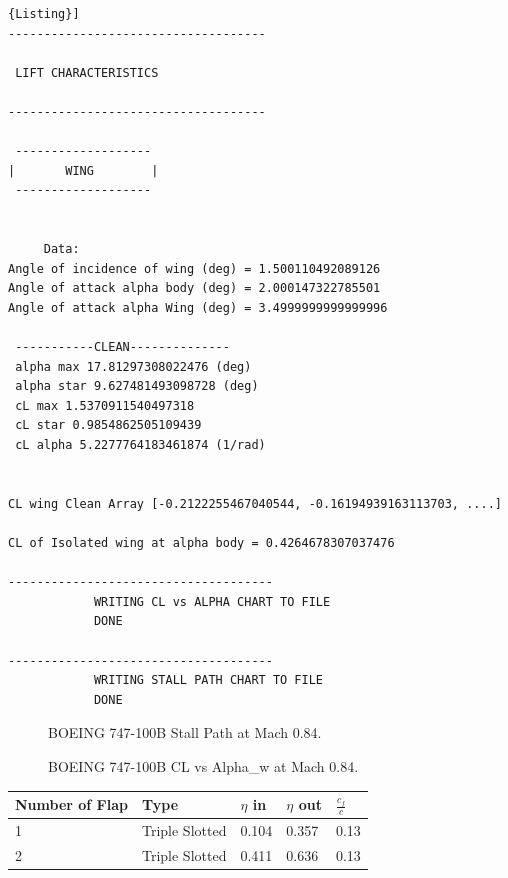 \begin{lstlisting}[caption={{\footnotesize Lift Characteristics of a Lifting Surface - Results. BOEING 747-100B}},label= [style=\bfseries]{Listing}]
------------------------------------

 LIFT CHARACTERISTICS  

------------------------------------

 ------------------- 
|       WING        |
 ------------------- 


	 Data: 
Angle of incidence of wing (deg) = 1.500110492089126
Angle of attack alpha body (deg) = 2.000147322785501
Angle of attack alpha Wing (deg) = 3.4999999999999996

 -----------CLEAN-------------- 
 alpha max 17.81297308022476 (deg)
 alpha star 9.627481493098728 (deg)
 cL max 1.5370911540497318
 cL star 0.9854862505109439
 cL alpha 5.2277764183461874 (1/rad)


CL wing Clean Array [-0.2122255467040544, -0.16194939163113703, ....]

CL of Isolated wing at alpha body = 0.4264678307037476

-------------------------------------
	 	 	WRITING CL vs ALPHA CHART TO FILE  
	 	 	DONE  

-------------------------------------
	 	 	WRITING STALL PATH CHART TO FILE  
	 	 	DONE  

\end{lstlisting}


\begin{figure}[H]
\centering

\caption{BOEING 747-100B Stall Path at Mach 0.84.}
\label{fig:stallB}
\end{figure}



\begin{figure}[H]
\centering

\caption{BOEING 747-100B CL vs Alpha_w at Mach 0.84.}
\label{fig:clB}
\end{figure}



\begin{center}
	\begin{tabular}{| l | l | l | l | l |}
		\hline
		 Number of Flap & Type &  $\eta$ in &  $\eta$ out &   $\frac{c_{f}}{c} $  \\ \hline
				1  & Triple Slotted&  0.104  & 0.357  & 0.13 \\ \hline 
		         2& Triple Slotted & 0.411 & 0.636 &0.13\\ \hline 
		\hline
	\end{tabular}
\end{center}


